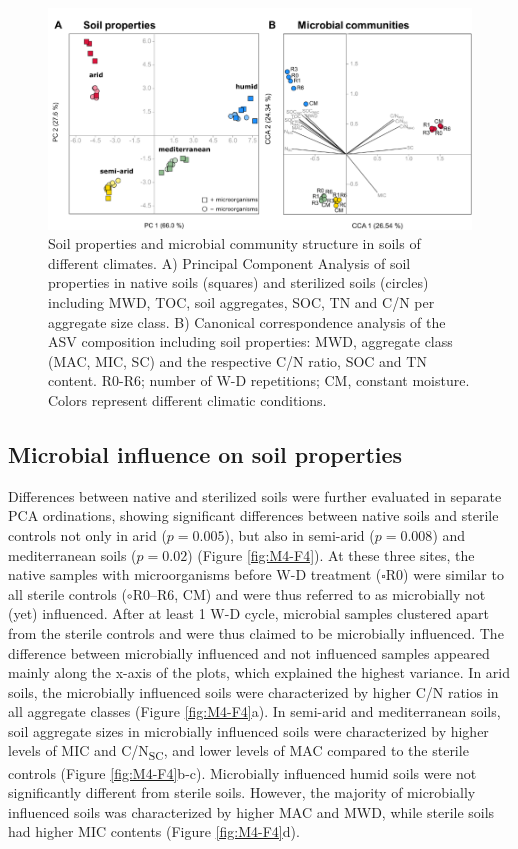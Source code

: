 \begin{figure}[H]
	\centering
	\includegraphics[width=1\textwidth]{img/M4-Figure_3.png}
	\caption{Soil properties and microbial community structure in soils of different climates. A) Principal Component Analysis of soil properties in native soils (squares) and sterilized soils (circles) including MWD, TOC, soil aggregates, SOC, TN and C/N per aggregate size class. B) Canonical correspondence analysis of the ASV composition including soil properties: MWD, aggregate class (MAC, MIC, SC) and the respective C/N ratio, SOC and TN content. R0-R6; number of W-D repetitions; CM, constant moisture. Colors represent different climatic conditions.}
	\label{fig:M4-F3}
\end{figure}

\subsection{Microbial influence on soil properties}

Differences between native and sterilized soils were further evaluated in separate PCA ordinations, showing significant differences between native soils and sterile controls not only in arid (\(p = 0.005\)), but also in semi-arid (\(p = 0.008\)) and mediterranean soils (\(p = 0.02\)) (Figure \ref{fig:M4-F4}). At these three sites, the native samples with microorganisms before W-D treatment (\(\square\)R0) were similar to all sterile controls (\(\circ\)R0--R6, CM) and were thus referred to as microbially not (yet) influenced. After at least 1 W-D cycle, microbial samples clustered apart from the sterile controls and were thus claimed to be microbially influenced. The difference between microbially influenced and not influenced samples appeared mainly along the x-axis of the plots, which explained the highest variance. In arid soils, the microbially influenced soils were characterized by higher C/N ratios in all aggregate classes (Figure \ref{fig:M4-F4}a). In semi-arid and mediterranean soils, soil aggregate sizes in microbially influenced soils were characterized by higher levels of MIC and C/N\textsubscript{SC}, and lower levels of MAC compared to the sterile controls (Figure \ref{fig:M4-F4}b-c). Microbially influenced humid soils were not significantly different from sterile soils. However, the majority of microbially influenced soils was characterized by higher MAC and MWD, while sterile soils had higher MIC contents (Figure \ref{fig:M4-F4}d).

